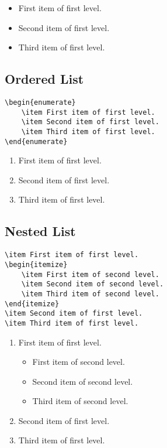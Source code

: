 \begin{itemize}
    \item First item of first level.
    \item Second item of first level.
    \item Third item of first level.
\end{itemize}

\subsection*{Ordered List}

\begin{lstlisting}[caption={An ordered list.}]
\begin{enumerate}
    \item First item of first level.
    \item Second item of first level.
    \item Third item of first level.
\end{enumerate}
\end{lstlisting}

\begin{enumerate}
    \item First item of first level.
    \item Second item of first level.
    \item Third item of first level.
\end{enumerate}

\subsection*{Nested List}

\begin{lstlisting}[caption={A nested list.}]
\item First item of first level.
\begin{itemize}
    \item First item of second level.
    \item Second item of second level.
    \item Third item of second level.
\end{itemize}
\item Second item of first level.
\item Third item of first level.
\end{lstlisting}

\begin{enumerate}
    \item First item of first level.
    \begin{itemize}
        \item First item of second level.
        \item Second item of second level.
        \item Third item of second level.
    \end{itemize}
    \item Second item of first level.
    \item Third item of first level.
\end{enumerate}

